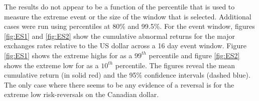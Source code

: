\documentclass[12pt, a4paper, oneside]{article} %
\begin{document}

The results do not appear to be a function of the percentile that is used to measure the extreme event or the size of the window that is selected. Additional cases were run using percentiles at 80\% and 99.5\%.  For the event window, figures \ref{fig:ES1} and \ref{fig:ES2} show the cumulative abnormal returns for the major exchanges rates relative to the US dollar across a 16 day event window.   Figure \ref{fig:ES1} shows the extreme highs for as a $99^{th}$ percentile and figure \ref{fig:ES2} shows the extreme low for as a $10^{th}$ percentile.  The figures reveal the mean cumulative return (in solid red) and the 95\% confidence intervals (dashed blue).  The only case where there seems to be any evidence of a reversal is for the extreme low risk-reversals on the Canadian dollar.  
\end{document}
